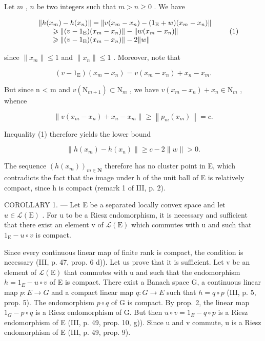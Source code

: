 Let \(m\) , \(n\) be two integers such that \(m > n \geqslant 0\) . We have

\[
\begin{array}{r l} & {\| h (x _ {m}) - h (x _ {n}) \| = \| v (x _ {m} - x _ {n}) - (1 _ {\mathrm{E}} + w) (x _ {m} - x _ {n}) \|} \\ & {\qquad \geqslant \| (v - 1 _ {\mathrm{E}}) (x _ {m} - x _ {n}) \| - \| w (x _ {m} - x _ {n}) \|} \\ & {\qquad \geqslant \| (v - 1 _ {\mathrm{E}}) (x _ {m} - x _ {n}) \| - 2 \| w \|} \end{array}\tag{1}
\]

since \(\| x_m\| \leqslant 1\) and \(\| x_n\| \leqslant 1\) . Moreover, note that

\[
(v - 1 _ {\mathrm{E}}) (x _ {m} - x _ {n}) = v (x _ {m} - x _ {n}) + x _ {n} - x _ {m}.
\]

But since n \textless{} m and \(v(\mathrm{N}_{m+1}) \subset \mathrm{N}_{m}\) , we have \(v(x_{m} - x_{n}) + x_{n} \in \mathrm{N}_{m}\) , whence

\[
\left\| v (x _ {m} - x _ {n}) + x _ {n} - x _ {m} \right\| \geqslant \left\| p _ {m} (x _ {m}) \right\| = c.
\]

Inequality (1) therefore yields the lower bound

\[
\left\| h \left(x _ {m}\right) - h \left(x _ {n}\right) \right\| \geqslant c - 2 \| w \| > 0.\tag{2}
\]

The sequence \((h(x_{m}))_{m\in\mathbf{N}}\) therefore has no cluster point in E, which contradicts the fact that the image under h of the unit ball of E is relatively compact, since h is compact (remark 1 of III, p. 2).

COROLLARY 1. --- Let E be a separated locally convex space and let \(u \in \mathcal{L}(\mathrm{E})\) . For u to be a Riesz endomorphism, it is necessary and sufficient that there exist an element v of \(\mathcal{L}(\mathrm{E})\) which commutes with u and such that \(1_{\mathrm{E}} - u \circ v\) is compact.

Since every continuous linear map of finite rank is compact, the condition is necessary (III, p. 47, prop. 6 d)). Let us prove that it is sufficient. Let v be an element of \(\mathcal{L}(\mathrm{E})\) that commutes with u and such that the endomorphism \(h = 1_{E} - u \circ v\) of E is compact. There exist a Banach space G, a continuous linear map \(p: E \to G\) and a compact linear map \(q: G \to E\) such that \(h = q \circ p\) (III, p. 5, prop. 5). The endomorphism \(p \circ q\) of G is compact. By prop. 2, the linear map \(1_{G} - p \circ q\) is a Riesz endomorphism of G. But then \(u \circ v = 1_{E} - q \circ p\) is a Riesz endomorphism of E (III, p. 49, prop. 10, g)). Since u and v commute, u is a Riesz endomorphism of E (III, p. 49, prop. 9).

